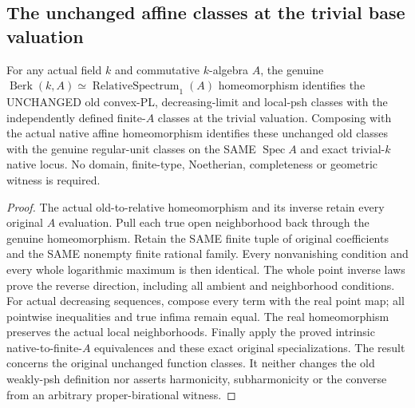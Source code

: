 \subsection{The unchanged affine classes at the trivial base valuation}
\begin{theorem}
\label{paper:original-affine-local-psh-comparison}
\leanok
For any actual field $k$ and commutative $k$-algebra $A$, the genuine
$\operatorname{Berk}(k,A)\simeq\operatorname{RelativeSpectrum}_{1}(A)$
homeomorphism identifies the UNCHANGED old convex-PL, decreasing-limit and
local-psh classes with the independently defined finite-$A$ classes at the
trivial valuation. Composing with the actual native affine homeomorphism
identifies these unchanged old classes with the genuine regular-unit classes
on the SAME $\operatorname{Spec}A$ and exact trivial-$k$ native locus.
No domain, finite-type, Noetherian, completeness or geometric witness is required.
\end{theorem}
\begin{proof}
The actual old-to-relative homeomorphism and its inverse retain every original
$A$ evaluation. Pull each true open neighborhood back through the genuine
homeomorphism. Retain the SAME finite tuple of original coefficients and the
SAME nonempty finite rational family. Every nonvanishing condition and every
whole logarithmic maximum is then identical. The whole point inverse laws
prove the reverse direction, including all ambient and neighborhood conditions.
For actual decreasing sequences, compose every term with the real point map;
all pointwise inequalities and true infima remain equal. The real homeomorphism
preserves the actual local neighborhoods. Finally apply the proved intrinsic
native-to-finite-$A$ equivalences and these exact original specializations.
The result concerns the original unchanged function classes. It neither changes
the old weakly-psh definition nor asserts harmonicity, subharmonicity or the
converse from an arbitrary proper-birational witness.
\end{proof}
